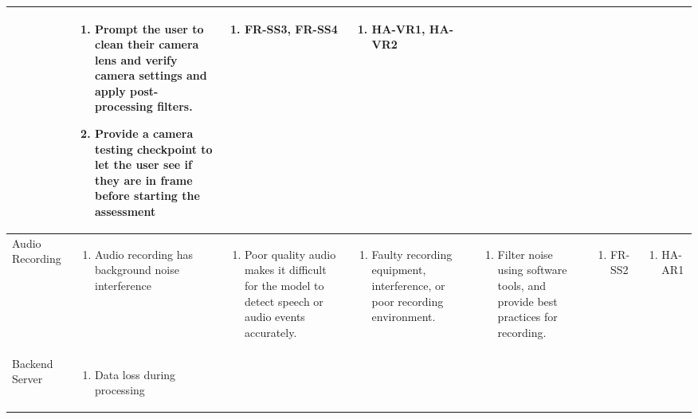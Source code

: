 \documentclass{article}
\begin{document}
\begin{landscape}
\begin{longtable}{|p{3cm}|p{3cm}|p{4cm}|p{4cm}|p{3cm}|p{2cm}|p{3cm}|}
\begin{enumerate}[leftmargin=*]
  \end{enumerate} &
  \begin{enumerate}[leftmargin=*]
       \item Prompt the user to clean their camera lens and verify camera settings and apply post-processing filters.
       \item Provide a camera testing checkpoint to let the user see if they are in frame before starting the assessment
  \end{enumerate} &
  \begin{enumerate}[leftmargin=*]
       \item FR-SS3, FR-SS4
  \end{enumerate} &
  \begin{enumerate}[leftmargin=*]
       \item HA-VR1, HA-VR2
  \end{enumerate} \\
  \hline
  Audio Recording  & 
  \begin{enumerate}[leftmargin=*]
      \item Audio recording has background noise interference
  \end{enumerate} & 
  \begin{enumerate}[leftmargin=*]
      \item Poor quality audio makes it difficult for the model to detect speech or audio events accurately.
  \end{enumerate} &
  \begin{enumerate}[leftmargin=*]
       \item Faulty recording equipment, interference, or poor recording environment.
  \end{enumerate} &
  \begin{enumerate}[leftmargin=*]
       \item Filter noise using software tools, and provide best practices for recording.
  \end{enumerate} &
  \begin{enumerate}[leftmargin=*]
       \item FR-SS2
  \end{enumerate} &
  \begin{enumerate}[leftmargin=*]
       \item HA-AR1
  \end{enumerate} \\
  \hline
  Backend Server & 
  \begin{enumerate}[leftmargin=*]
      \item Data loss during processing

\end{enumerate}
\end{longtable}
\end{landscape}
\end{document}
